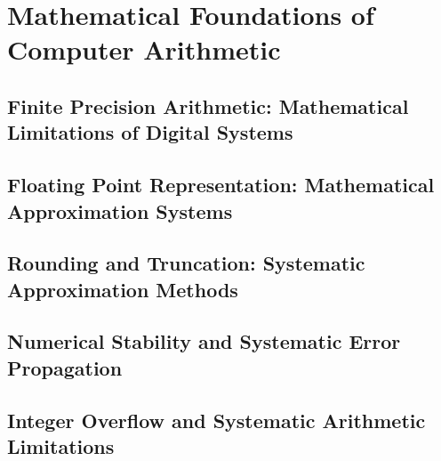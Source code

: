 

\chapter{Mathematical Foundations of Computer Arithmetic}

\section{Finite Precision Arithmetic: Mathematical Limitations of Digital Systems}

\section{Floating Point Representation: Mathematical Approximation Systems}

\section{Rounding and Truncation: Systematic Approximation Methods}

\section{Numerical Stability and Systematic Error Propagation}

\section{Integer Overflow and Systematic Arithmetic Limitations}
